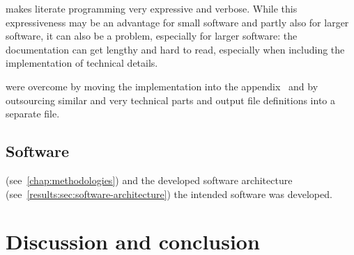 \documentclass[%
    a4paper,    %
    justified,  %
    nobib,      %
    openany     %
]{tufte-book}
\begin{document}
 makes literate programming very
expressive and verbose. While this expressiveness may be an advantage for small
software and partly also for larger software, it can also be a problem,
especially for larger software: the documentation can get lengthy and hard to
read, especially when including the implementation of technical details.

 were overcome by moving the implementation into the
appendix~ and by outsourcing similar
and very technical parts and output file definitions into a separate
file.~

\section{Software}
\label{results:sec:software}

(see~\ref{chap:methodologies}) and the developed software architecture
(see~\ref{results:sec:software-architecture}) the intended software was
developed.

\chapter{Discussion and conclusion}
\label{chap:discussion-conclusion}



\end{document}
